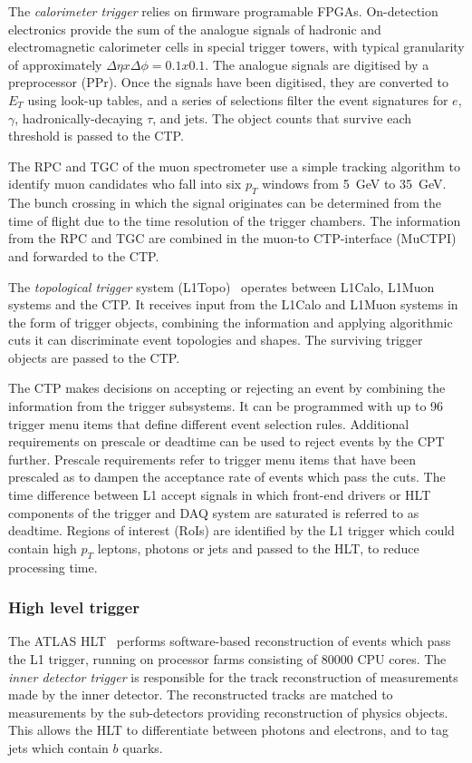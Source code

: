 The \emph{calorimeter trigger} relies on firmware programable FPGAs. On-detection electronics provide the sum of the analogue signals of hadronic and electromagnetic calorimeter cells in special trigger towers, with typical granularity of approximately $\Delta\eta x \Delta\phi = 0.1 x 0.1$. The analogue signals are digitised by a preprocessor (PPr). Once the signals have been digitised, they are converted to $E_{T}$ using look-up tables, and a series of selections filter the event signatures for $e$, $\gamma$, hadronically-decaying $\tau$, and jets. The object counts that survive each threshold is passed to the CTP. 

The RPC and TGC of the muon spectrometer use a simple tracking algorithm to identify muon candidates who fall into six $p_{T}$ windows from \SI{5}{\giga\electronvolt} to \SI{35}{\giga\electronvolt}. The bunch crossing in which the signal originates can be determined from the time of flight due to the time resolution of the trigger chambers. The information from the RPC and TGC are combined in the muon-to CTP-interface (MuCTPI) and forwarded to the CTP. 

The \emph{topological trigger} system (L1Topo)~\cite{ATLAS:L1Topo} operates between L1Calo, L1Muon systems and the CTP. It receives input from the L1Calo and L1Muon systems in the form of trigger objects, combining the information and applying algorithmic cuts it can discriminate event topologies and shapes. The surviving trigger objects are passed to the CTP.

The CTP makes decisions on accepting or rejecting an event by combining the information from the trigger subsystems. It can be programmed with up to 96 trigger menu items that define different event selection rules. Additional requirements on prescale or deadtime can be used to reject events by the CPT further. Prescale requirements refer to trigger menu items that have been prescaled as to dampen the acceptance rate of events which pass the cuts. The time difference between L1 accept signals in which front-end drivers or HLT components of the trigger and DAQ system are saturated is referred to as deadtime. Regions of interest (RoIs) are identified by the L1 trigger which could contain high $p_T$ leptons, photons or jets and passed to the HLT, to reduce processing time. 

\subsubsection{High level trigger}
The ATLAS HLT~\cite{ATLAS:HLT-TDR,ATLAS:TDAQ-Run2} performs software-based reconstruction of events which pass the L1 trigger, running on processor farms consisting of 80000 CPU cores. The \emph{inner detector trigger} is responsible for the track reconstruction of measurements made by the inner detector. The reconstructed tracks are matched to measurements by the sub-detectors providing reconstruction of physics objects. This allows the HLT to differentiate between photons and electrons, and to tag jets which contain $b$ quarks. 

